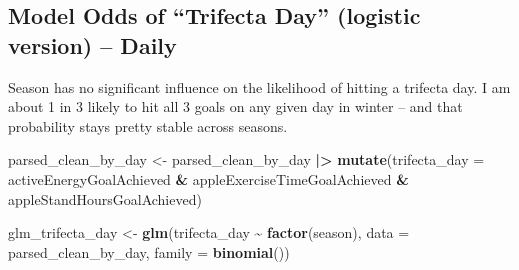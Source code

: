 \documentclass[
  11pt,
]{article}
\newenvironment{Shaded}{\begin{snugshade}}{\end{snugshade}}
\newcommand{\AttributeTok}[1]{\textcolor[rgb]{0.13,0.29,0.53}{#1}}
\newcommand{\FunctionTok}[1]{\textcolor[rgb]{0.13,0.29,0.53}{\textbf{#1}}}
\newcommand{\NormalTok}[1]{#1}
\newcommand{\OtherTok}[1]{\textcolor[rgb]{0.56,0.35,0.01}{#1}}
\newcommand{\SpecialCharTok}[1]{\textcolor[rgb]{0.81,0.36,0.00}{\textbf{#1}}}
\begin{document}
\subsection{Model Odds of ``Trifecta Day'' (logistic version) --
Daily}\label{model-odds-of-trifecta-day-logistic-version-daily}

Season has no significant influence on the likelihood of hitting a
trifecta day. I am about 1 in 3 likely to hit all 3 goals on any given
day in winter -- and that probability stays pretty stable across
seasons.

\begin{Shaded}
\begin{Highlighting}[]
\NormalTok{parsed\_clean\_by\_day }\OtherTok{\textless{}{-}}\NormalTok{ parsed\_clean\_by\_day }\SpecialCharTok{|\textgreater{}}
  \FunctionTok{mutate}\NormalTok{(}\AttributeTok{trifecta\_day =}\NormalTok{ activeEnergyGoalAchieved }\SpecialCharTok{\&}\NormalTok{ appleExerciseTimeGoalAchieved }\SpecialCharTok{\&}\NormalTok{ appleStandHoursGoalAchieved)}

\NormalTok{glm\_trifecta\_day }\OtherTok{\textless{}{-}} \FunctionTok{glm}\NormalTok{(trifecta\_day }\SpecialCharTok{\textasciitilde{}} \FunctionTok{factor}\NormalTok{(season), }\AttributeTok{data =}\NormalTok{ parsed\_clean\_by\_day, }\AttributeTok{family =} \FunctionTok{binomial}\NormalTok{())}
\end{Highlighting}
\end{Shaded}
\end{document}
